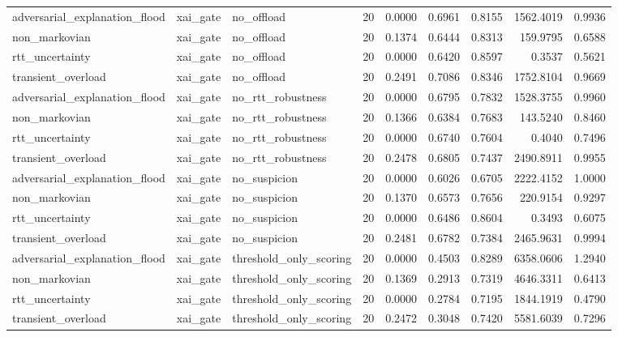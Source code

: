 \begin{table}[t]
\begin{tabular}{lllrrrrrr}
adversarial\_explanation\_flood & xai\_gate & no\_offload & 20 & 0.0000 & 0.6961 & 0.8155 & 1562.4019 & 0.9936 \\
non\_markovian & xai\_gate & no\_offload & 20 & 0.1374 & 0.6444 & 0.8313 & 159.9795 & 0.6588 \\
rtt\_uncertainty & xai\_gate & no\_offload & 20 & 0.0000 & 0.6420 & 0.8597 & 0.3537 & 0.5621 \\
transient\_overload & xai\_gate & no\_offload & 20 & 0.2491 & 0.7086 & 0.8346 & 1752.8104 & 0.9669 \\
adversarial\_explanation\_flood & xai\_gate & no\_rtt\_robustness & 20 & 0.0000 & 0.6795 & 0.7832 & 1528.3755 & 0.9960 \\
non\_markovian & xai\_gate & no\_rtt\_robustness & 20 & 0.1366 & 0.6384 & 0.7683 & 143.5240 & 0.8460 \\
rtt\_uncertainty & xai\_gate & no\_rtt\_robustness & 20 & 0.0000 & 0.6740 & 0.7604 & 0.4040 & 0.7496 \\
transient\_overload & xai\_gate & no\_rtt\_robustness & 20 & 0.2478 & 0.6805 & 0.7437 & 2490.8911 & 0.9955 \\
adversarial\_explanation\_flood & xai\_gate & no\_suspicion & 20 & 0.0000 & 0.6026 & 0.6705 & 2222.4152 & 1.0000 \\
non\_markovian & xai\_gate & no\_suspicion & 20 & 0.1370 & 0.6573 & 0.7656 & 220.9154 & 0.9297 \\
rtt\_uncertainty & xai\_gate & no\_suspicion & 20 & 0.0000 & 0.6486 & 0.8604 & 0.3493 & 0.6075 \\
transient\_overload & xai\_gate & no\_suspicion & 20 & 0.2481 & 0.6782 & 0.7384 & 2465.9631 & 0.9994 \\
adversarial\_explanation\_flood & xai\_gate & threshold\_only\_scoring & 20 & 0.0000 & 0.4503 & 0.8289 & 6358.0606 & 1.2940 \\
non\_markovian & xai\_gate & threshold\_only\_scoring & 20 & 0.1369 & 0.2913 & 0.7319 & 4646.3311 & 0.6413 \\
rtt\_uncertainty & xai\_gate & threshold\_only\_scoring & 20 & 0.0000 & 0.2784 & 0.7195 & 1844.1919 & 0.4790 \\
transient\_overload & xai\_gate & threshold\_only\_scoring & 20 & 0.2472 & 0.3048 & 0.7420 & 5581.6039 & 0.7296 \\
\bottomrule
\end{tabular}
\end{table}
